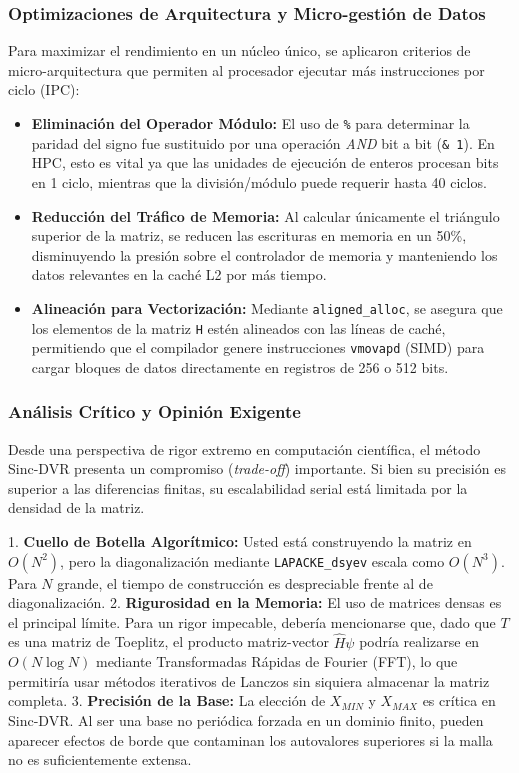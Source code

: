 \documentclass[11pt,fleqn]{article}
\begin{document}
\subsubsection{Optimizaciones de Arquitectura y Micro-gestión de Datos}
Para maximizar el rendimiento en un núcleo único, se aplicaron criterios de micro-arquitectura que permiten al procesador ejecutar más instrucciones por ciclo (IPC):
\begin{itemize}
    \item \textbf{Eliminación del Operador Módulo:} El uso de \texttt{\%} para determinar la paridad del signo fue sustituido por una operación \textit{AND} bit a bit (\texttt{\& 1}). En HPC, esto es vital ya que las unidades de ejecución de enteros procesan bits en 1 ciclo, mientras que la división/módulo puede requerir hasta 40 ciclos.
    \item \textbf{Reducción del Tráfico de Memoria:} Al calcular únicamente el triángulo superior de la matriz, se reducen las escrituras en memoria en un 50\%, disminuyendo la presión sobre el controlador de memoria y manteniendo los datos relevantes en la caché L2 por más tiempo.
    \item \textbf{Alineación para Vectorización:} Mediante \texttt{aligned\_alloc}, se asegura que los elementos de la matriz \texttt{H} estén alineados con las líneas de caché, permitiendo que el compilador genere instrucciones \texttt{vmovapd} (SIMD) para cargar bloques de datos directamente en registros de 256 o 512 bits.
\end{itemize}

\subsubsection{Análisis Crítico y Opinión Exigente}
Desde una perspectiva de rigor extremo en computación científica, el método Sinc-DVR presenta un compromiso (\textit{trade-off}) importante. Si bien su precisión es superior a las diferencias finitas, su escalabilidad serial está limitada por la densidad de la matriz.

1. \textbf{Cuello de Botella Algorítmico:} Usted está construyendo la matriz en $O(N^2)$, pero la diagonalización mediante \texttt{LAPACKE\_dsyev} escala como $O(N^3)$. Para $N$ grande, el tiempo de construcción es despreciable frente al de diagonalización. 
2. \textbf{Rigurosidad en la Memoria:} El uso de matrices densas es el principal límite. Para un rigor impecable, debería mencionarse que, dado que $T$ es una matriz de Toeplitz, el producto matriz-vector $\hat{H}\psi$ podría realizarse en $O(N \log N)$ mediante Transformadas Rápidas de Fourier (FFT), lo que permitiría usar métodos iterativos de Lanczos sin siquiera almacenar la matriz completa.
3. \textbf{Precisión de la Base:} La elección de $X_{MIN}$ y $X_{MAX}$ es crítica en Sinc-DVR. Al ser una base no periódica forzada en un dominio finito, pueden aparecer efectos de borde que contaminan los autovalores superiores si la malla no es suficientemente extensa.
\end{document}
